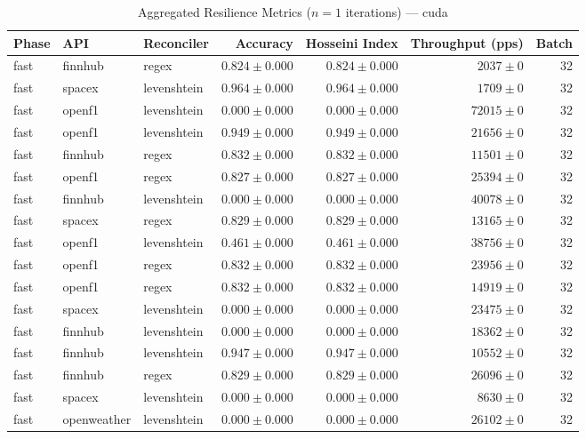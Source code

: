 
\begin{table}[htbp]
\caption{Aggregated Resilience Metrics ($n=1$ iterations) --- cuda}
\begin{tabular}{l l l r r r r}
\hline
Phase & API & Reconciler & Accuracy & Hosseini Index & Throughput (pps) & Batch \\
\hline
fast & finnhub & regex & $0.824\pm0.000$ & $0.824\pm0.000$ & $2037\pm0$ & 32 \\
fast & spacex & levenshtein & $0.964\pm0.000$ & $0.964\pm0.000$ & $1709\pm0$ & 32 \\
fast & openf1 & levenshtein & $0.000\pm0.000$ & $0.000\pm0.000$ & $72015\pm0$ & 32 \\
fast & openf1 & levenshtein & $0.949\pm0.000$ & $0.949\pm0.000$ & $21656\pm0$ & 32 \\
fast & finnhub & regex & $0.832\pm0.000$ & $0.832\pm0.000$ & $11501\pm0$ & 32 \\
fast & openf1 & regex & $0.827\pm0.000$ & $0.827\pm0.000$ & $25394\pm0$ & 32 \\
fast & finnhub & levenshtein & $0.000\pm0.000$ & $0.000\pm0.000$ & $40078\pm0$ & 32 \\
fast & spacex & regex & $0.829\pm0.000$ & $0.829\pm0.000$ & $13165\pm0$ & 32 \\
fast & openf1 & levenshtein & $0.461\pm0.000$ & $0.461\pm0.000$ & $38756\pm0$ & 32 \\
fast & openf1 & regex & $0.832\pm0.000$ & $0.832\pm0.000$ & $23956\pm0$ & 32 \\
fast & openf1 & regex & $0.832\pm0.000$ & $0.832\pm0.000$ & $14919\pm0$ & 32 \\
fast & spacex & levenshtein & $0.000\pm0.000$ & $0.000\pm0.000$ & $23475\pm0$ & 32 \\
fast & finnhub & levenshtein & $0.000\pm0.000$ & $0.000\pm0.000$ & $18362\pm0$ & 32 \\
fast & finnhub & levenshtein & $0.947\pm0.000$ & $0.947\pm0.000$ & $10552\pm0$ & 32 \\
fast & finnhub & regex & $0.829\pm0.000$ & $0.829\pm0.000$ & $26096\pm0$ & 32 \\
fast & spacex & levenshtein & $0.000\pm0.000$ & $0.000\pm0.000$ & $8630\pm0$ & 32 \\
fast & openweather & levenshtein & $0.000\pm0.000$ & $0.000\pm0.000$ & $26102\pm0$ & 32 \\

\end{tabular}
\end{table}
